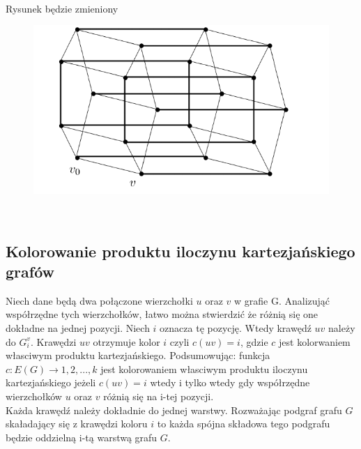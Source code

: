 \documentclass[12pt,a4paper,titlepage]{article}
\begin{document}
\\
Rysunek będzie zmieniony \\
\begin{figure}
\includegraphics{rys1.png}
\end{figure}
\\
\subsection{Kolorowanie produktu iloczynu kartezjańskiego grafów}
Niech dane będą dwa połączone wierzchołki $u$ oraz $v$ w grafie G. Analizująć współrzędne tych wierzchołków, łatwo można stwierdzić że różnią się one dokładne na jednej pozycji. Niech $i$ oznacza tę pozycję. Wtedy krawędź $uv$ należy do $G_i^v$. Krawędzi $uv$  otrzymuje kolor $i$ czyli $c(uv) = i$, gdzie $c$ jest kolorwaniem własciwym produktu kartezjańskiego. Podsumowując: funkcja $c: E(G) \rightarrow {1,2,...,k}$ jest kolorowaniem własciwym produktu iloczynu kartezjańskiego jeżeli $c(uv) = i $ wtedy i tylko wtedy gdy współrzędne wierzchołków $u$ oraz $v$ różnią się na i-tej pozycji.\\
Każda krawędź należy dokładnie do jednej warstwy. Rozważając podgraf grafu $G$ skaładający się z krawędzi koloru $i$ to każda spójna składowa tego podgrafu będzie oddzielną i-tą warstwą grafu $G$.
\end{document}
